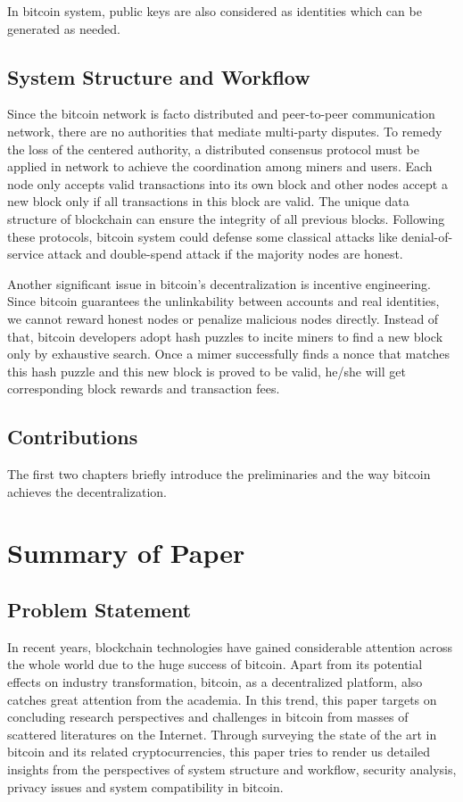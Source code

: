 \documentclass[conference]{IEEEtran}
\begin{document}
In bitcoin system, public keys are also considered as identities which can be generated as needed.

\subsection{System Structure and Workflow}
Since the bitcoin network is facto distributed and peer-to-peer communication network, there are no authorities that mediate multi-party disputes.
%
To remedy the loss of the centered authority, a distributed consensus protocol must be applied in network to achieve the coordination among miners and users.
%
Each node only accepts valid transactions into its own block and other nodes accept a new block only if all transactions in this block are valid.
%
The unique data structure of blockchain can ensure the integrity of all previous blocks. 
%
Following these protocols, bitcoin system could defense some classical attacks like denial-of-service attack and double-spend attack if the majority nodes are honest.

Another significant issue in bitcoin's decentralization is incentive engineering.
%
Since bitcoin guarantees the unlinkability between accounts and real identities, we cannot reward honest nodes or penalize malicious nodes directly.
%
Instead of that, bitcoin developers adopt hash puzzles to incite miners to find a new block only by exhaustive search.
%
Once a mimer successfully finds a nonce that matches this hash puzzle and this new block is proved to be valid, he/she will get corresponding block rewards and transaction fees.

\subsection{Contributions}
The first two chapters briefly introduce the preliminaries and the way bitcoin achieves the decentralization. 


\section{Summary of Paper\cite{bonneau2015sok}}

\subsection{Problem Statement}
In recent years, blockchain technologies have gained considerable attention across the whole world due to the huge success of bitcoin. 
%
Apart from its potential effects on industry transformation, bitcoin, as a decentralized platform, also catches great attention from the academia.
%
In this trend, this paper\cite{bonneau2015sok} targets on concluding research perspectives and challenges in bitcoin from masses of scattered literatures on the Internet.
%
Through surveying the state of the art in bitcoin and its related cryptocurrencies, this paper tries to render us detailed insights from the perspectives of system structure and workflow, security analysis, privacy issues and system compatibility in bitcoin.
\end{document}
